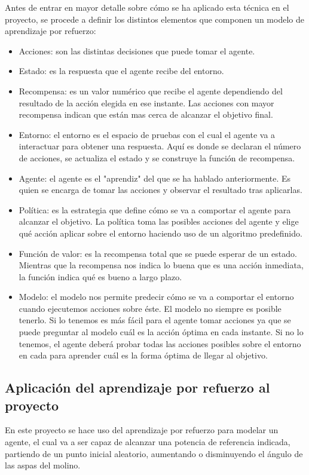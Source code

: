 Antes de entrar en mayor detalle sobre cómo se ha aplicado esta técnica en el proyecto, se procede a definir los distintos elementos que componen un modelo de aprendizaje por refuerzo:
\begin{itemize}
    \item Acciones: son las distintas decisiones que puede tomar el agente.
    \item Estado: es la respuesta que el agente recibe del entorno.
    \item Recompensa: es un valor numérico que recibe el agente dependiendo del resultado de la acción elegida en ese instante. Las acciones con mayor recompensa indican que están mas cerca de alcanzar el objetivo final.
    \item Entorno: el entorno es el espacio de pruebas con el cual el agente va a interactuar para obtener una respuesta. Aquí es donde se declaran el número de acciones, se actualiza el estado y se construye la función de recompensa.
    \item Agente: el agente es el "aprendiz" del que se ha hablado anteriormente. Es quien se encarga de tomar las acciones y observar el resultado tras aplicarlas.
    \item Política: es la estrategia que define cómo se va a comportar el agente para alcanzar el objetivo. La política toma las posibles acciones del agente y elige qué acción aplicar sobre el entorno haciendo uso de un algoritmo predefinido.
    \item Función de valor: es la recompensa total que se puede esperar de un estado. Mientras que la recompensa nos indica lo buena que es una acción inmediata, la función indica qué es bueno a largo plazo.
    \item Modelo: el modelo nos permite predecir cómo se va a comportar el entorno cuando ejecutemos acciones sobre éste. 
    El modelo no siempre es posible tenerlo. Si lo tenemos es más fácil para el agente tomar acciones ya que se puede preguntar al modelo cuál es la acción óptima en cada instante. Si no lo tenemos, el agente deberá probar todas las acciones posibles sobre el entorno en cada para aprender cuál es la forma óptima de llegar al objetivo.
\end{itemize}

\subsection{Aplicación del aprendizaje por refuerzo al proyecto}

En este proyecto se hace uso del aprendizaje por refuerzo para modelar un agente, el cual va a ser capaz de alcanzar una potencia de referencia indicada, partiendo de un punto inicial aleatorio, aumentando o disminuyendo el ángulo de las aspas del molino.

